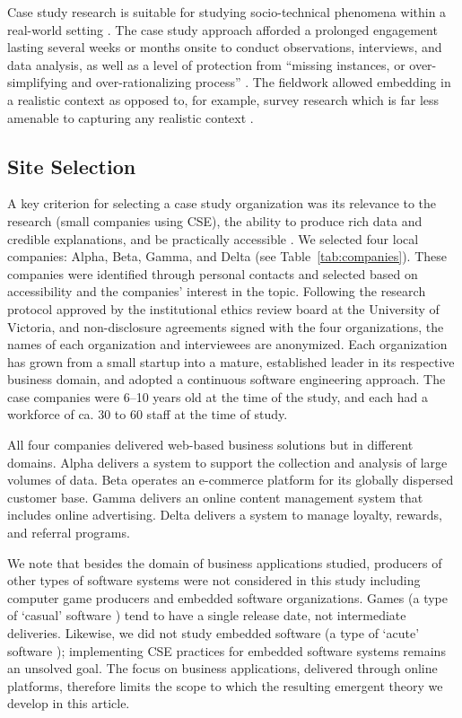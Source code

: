 \documentclass[smallextended]{svjour3}
\begin{document}
Case study research is suitable for studying socio-technical phenomena within a real-world setting  \cite[p. 1]{yin_case_2002}.
The case study approach afforded a prolonged engagement lasting several weeks or months onsite to conduct observations, interviews, and data analysis, as well as a level of protection from ``missing instances, or over-simplifying and over-rationalizing process'' \citep{ralph_tse_theories}. The fieldwork allowed embedding in a realistic context as opposed to, for example, survey research which is far less amenable to capturing any realistic context \citep{stol2018abc}.

\subsection{Site Selection}
\label{sec:sites}

A key criterion for selecting a case study organization was its relevance to the research (small companies using CSE), the ability to produce rich data and credible explanations, and be practically accessible \citep{miles1994qualitative}.
We selected four local companies: Alpha, Beta, Gamma, and Delta (see Table~\ref{tab:companies}).
These companies were identified through personal contacts and selected based on accessibility and the companies' interest in the topic. 
Following the research protocol approved by the institutional ethics review board at the University of Victoria, and non-disclosure agreements signed with the four organizations, the names of each organization and interviewees are anonymized.
Each organization has grown from a small startup into a mature, established leader in its respective business domain, and adopted a continuous software engineering approach.
The case companies were 6--10 years old at the time of the study, and each had a workforce of ca. 30 to 60 staff at the time of study.  

All four companies delivered web-based business solutions but in different domains. Alpha delivers a system to support the collection and analysis of large volumes of data. Beta operates an e-commerce platform for its globally dispersed customer base. Gamma delivers an online content management system that includes online advertising. Delta delivers a system to manage loyalty, rewards, and referral programs. 

We note that besides the domain of business applications studied, producers of other types of software systems were not considered in this study including computer game producers and embedded software organizations. Games (a type of `casual' software \citep{meyer2013}) tend to have a single release date, not intermediate deliveries. Likewise, we did not study embedded software (a type of `acute' software \citep{meyer2013}); implementing CSE practices for embedded software systems remains an unsolved goal. The focus on business applications, delivered through online platforms, therefore limits the scope to which the resulting emergent theory we develop in this article. 
\end{document}
